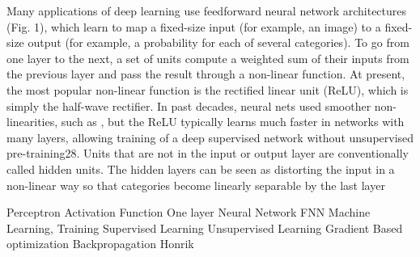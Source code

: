 Many applications of deep learning use feedforward neural network architectures (Fig. 1), which learn to map a fixed-size input (for example, an image) to a fixed-size output (for example, a probability for each of several categories). To go from one layer to the next, a set of units compute a weighted sum of their inputs from the previous layer and pass the result through a non-linear function. At present, the most popular non-linear function is the rectified linear unit (ReLU), which is simply the half-wave rectifier. In past decades, neural nets used smoother non-linearities, such as , but the ReLU typically learns much faster in networks with many layers, allowing training of a deep supervised network without unsupervised pre-training28. Units that are not in the input or output layer are conventionally called hidden units. The hidden layers can be seen as distorting the input in a non-linear way so that categories become linearly separable by the last layer 



Perceptron
Activation Function
One layer
Neural Network
FNN
Machine Learning, Training 
Supervised Learning
Unsupervised Learning
Gradient Based optimization
Backpropagation 
Honrik 